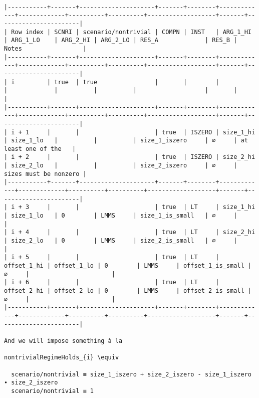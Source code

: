 \documentclass[varwidth=\maxdimen,margin=0.5cm,multi={verbatim}]{standalone}
\begin{document}
\begin{verbatim}

|-----------+-------+---------------------+-------+--------+-------------+-------------+----------+----------+-------------------+-------+-----------------------|
| Row index | SCNRI | scenario/nontrivial | COMPN | INST   | ARG_1_HI    | ARG_1_LO    | ARG_2_HI | ARG_2_LO | RES_A             | RES_B | Notes                 |
|-----------+-------+---------------------+-------+--------+-------------+-------------+----------+----------+-------------------+-------+-----------------------|
| i         | true  | true                |       |        |             |             |          |          |                   |       |                       |
|-----------+-------+---------------------+-------+--------+-------------+-------------+----------+----------+-------------------+-------+-----------------------|
| i + 1     |       |                     | true  | ISZERO | size_1_hi   | size_1_lo   |          |          | size_1_iszero     | ∅     | at least one of the   |
| i + 2     |       |                     | true  | ISZERO | size_2_hi   | size_2_lo   |          |          | size_2_iszero     | ∅     | sizes must be nonzero |
|-----------+-------+---------------------+-------+--------+-------------+-------------+----------+----------+-------------------+-------+-----------------------|
| i + 3     |       |                     | true  | LT     | size_1_hi   | size_1_lo   | 0        | LMMS     | size_1_is_small   | ∅     |                       |
| i + 4     |       |                     | true  | LT     | size_2_hi   | size_2_lo   | 0        | LMMS     | size_2_is_small   | ∅     |                       |
| i + 5     |       |                     | true  | LT     | offset_1_hi | offset_1_lo | 0        | LMMS     | offset_1_is_small | ∅     |                       |           
| i + 6     |       |                     | true  | LT     | offset_2_hi | offset_2_lo | 0        | LMMS     | offset_2_is_small | ∅     |                       |           
|-----------+-------+---------------------+-------+--------+-------------+-------------+----------+----------+-------------------+-------+-----------------------|

And we will impose something à la

nontrivialRegimeHolds_{i} \equiv 

  scenario/nontrivial ≡ size_1_iszero + size_2_iszero - size_1_iszero ∙ size_2_iszero
  scenario/nontrivial ≡ 1

\end{verbatim}
\end{document}
